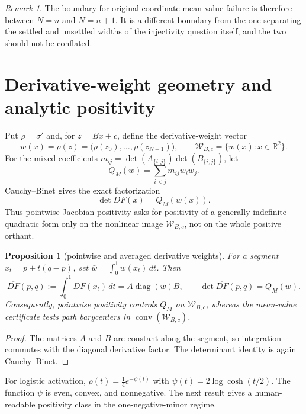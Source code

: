 \documentclass[11pt,twoside,leqno]{article}
\theoremstyle{plain}
\newtheorem{proposition}[proposition]{Proposition}
\theoremstyle{definition}
\theoremstyle{remark}
\newtheorem{remark}[remark]{Remark}
\newcommand{\R}{\mathbb{R}}
\newcommand{\Wder}{\mathcal{W}_{B,c}}
\begin{document}
\begin{remark}
The boundary for original-coordinate mean-value failure is therefore between
$N=n$ and $N=n+1$.  It is a different boundary from the one separating the
settled and unsettled widths of the injectivity question itself, and the two
should not be conflated.
\end{remark}

\section{Derivative-weight geometry and analytic positivity}\label{sec:weights}

Put $\rho=\sigma'$ and, for $z=Bx+c$, define the derivative-weight vector
\[
 w(x)=\rho(z)=\bigl(\rho(z_0),\ldots,\rho(z_{N-1})\bigr),
 \qquad
 \Wder=\{w(x):x\in\R^2\}.
\]
For the mixed coefficients $m_{ij}=\det(A_{\{i,j\}})\det(B_{\{i,j\}})$, let
\[
 Q_M(w)=\sum_{i<j}m_{ij}w_iw_j.
\]
Cauchy--Binet gives the exact factorization
\begin{equation}\label{eq:weight-factorization}
 \det DF(x)=Q_M(w(x)).
\end{equation}
Thus pointwise Jacobian positivity asks for positivity of a generally indefinite quadratic form only on the nonlinear image $\Wder$, not on the whole positive orthant.

\begin{proposition}[pointwise and averaged derivative weights]\label{prop:weight-average}
For a segment $x_t=p+t(q-p)$, set $\bar w=\int_0^1w(x_t)\,dt$.  Then
\[
 \overline{DF}(p,q):=\int_0^1DF(x_t)\,dt
 =A\operatorname{diag}(\bar w)B,
 \qquad
 \det\overline{DF}(p,q)=Q_M(\bar w).
\]
Consequently, pointwise positivity controls $Q_M$ on $\Wder$, whereas the mean-value certificate tests path barycenters in $\operatorname{conv}(\Wder)$.
\end{proposition}
\begin{proof}
The matrices $A$ and $B$ are constant along the segment, so integration commutes with the diagonal derivative factor.  The determinant identity is again Cauchy--Binet.
\end{proof}

For logistic activation, $\rho(t)=\tfrac14e^{-\psi(t)}$ with $\psi(t)=2\log\cosh(t/2)$.  The function $\psi$ is even, convex, and nonnegative.  The next result gives a human-readable positivity class in the one-negative-minor regime.
\end{document}

